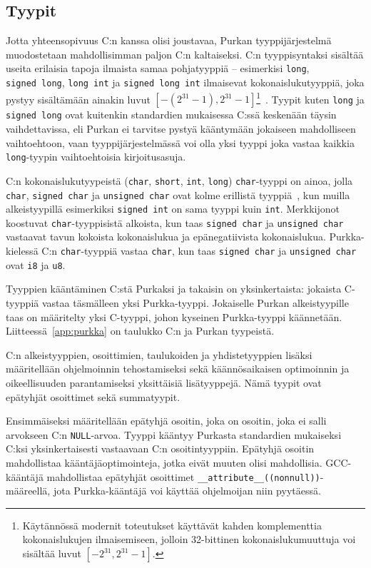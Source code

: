 \subsection{Tyypit}

Jotta yhteensopivuus C:n kanssa olisi joustavaa, Purkan tyyppijärjestelmä
muodostetaan mahdollisimman paljon C:n kaltaiseksi. C:n tyyppisyntaksi sisältää
useita erilaisia tapoja ilmaista samaa pohjatyyppiä -- esimerkisi
\texttt{long}, \texttt{signed~long}, \texttt{long~int} ja
\texttt{signed~long~int} ilmaisevat kokonaislukutyyppiä, joka pystyy
sisältämään ainakin luvut $[-(2^{31} - 1), 2^{31}-1]$\footnote{Käytännössä
modernit toteutukset käyttävät kahden komplementtia kokonaislukujen
ilmaisemiseen, jolloin 32-bittinen kokonaislukumuuttuja voi sisältää luvut
$[-2^{31}, 2^{31} - 1]$.}~\citep{C18}. Tyypit kuten \texttt{long} ja
\texttt{signed long} ovat kuitenkin standardien mukaisessa C:ssä keskenään
täysin vaihdettavissa, eli Purkan ei tarvitse pystyä kääntymään jokaiseen
mahdolliseen vaihtoehtoon, vaan tyyppijärjestelmässä voi olla yksi tyyppi joka
vastaa kaikkia \texttt{long}-tyypin vaihtoehtoisia kirjoitusasuja.

C:n kokonaislukutyypeistä (\texttt{char}, \texttt{short}, \texttt{int},
\texttt{long}) \texttt{char}-tyyppi on ainoa, jolla \texttt{char},
\texttt{signed char} ja \texttt{unsigned char} ovat kolme erillistä
tyyppiä~\citep{C18}, kun muilla alkeistyypillä esimerkiksi \texttt{signed int}
on sama tyyppi kuin \texttt{int}. Merkkijonot koostuvat
\texttt{char}-tyyppisistä alkoista, kun taas \texttt{signed char} ja
\texttt{unsigned char} vastaavat tavun kokoista kokonaislukua ja
epänegatiivista kokonaislukua. Purkka-kielessä C:n \texttt{char}-tyyppiä
vastaa \texttt{char}, kun taas \texttt{signed char} ja \texttt{unsigned char}
ovat \texttt{i8} ja \texttt{u8}.

Tyyppien kääntäminen C:stä Purkaksi ja takaisin on yksinkertaista: jokaista
C-tyyppiä vastaa täsmälleen yksi Purkka-tyyppi. Jokaiselle Purkan
alkeistyypille taas on määritelty yksi C-tyyppi, johon kyseinen Purkka-tyyppi
käännetään. Liitteessä~\ref{app:purkka} on taulukko C:n ja Purkan tyypeistä. 

C:n alkeistyyppien, osoittimien, taulukoiden ja yhdistetyyppien lisäksi
määritellään ohjelmoinnin tehostamiseksi sekä käännösaikaisen optimoinnin ja
oikeellisuuden parantamiseksi yksittäisiä lisätyyppejä. Nämä tyypit ovat
epätyhjät osoittimet sekä summatyypit.

Ensimmäiseksi määritellään epätyhjä osoitin, joka on osoitin, joka ei salli
arvokseen C:n \texttt{NULL}-arvoa. Tyyppi kääntyy Purkasta standardien
mukaiseksi C:ksi yksinkertaisesti vastaavaan C:n osoitintyyppiin. Epätyhjä
osoitin mahdollistaa kääntäjäoptimointeja, jotka eivät muuten olisi
mahdollisia. GCC-kääntäjä mahdollistaa epätyhjät osoittimet
\texttt{\_\_attribute\_\_((nonnull))}-määreellä, jota Purkka-kääntäjä voi
käyttää ohjelmoijan niin pyytäessä.


